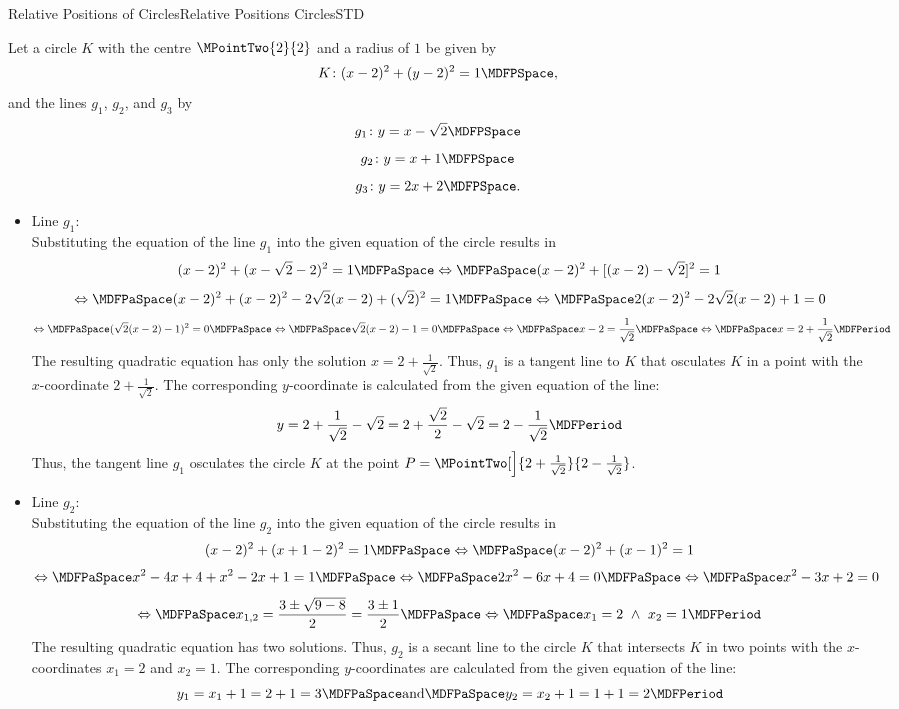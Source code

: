 \begin{MXContent}{Relative Positions of Circles}{Relative Positions Circles}{STD}
\begin{MInfo}
\end{MInfo}

\begin{MExample}
Let a circle $K$ with the centre $\MPointTwo{2}{2}$ and a radius of $1$ be given by
\[
 K\colon (x-2)^2 + (y-2)^2=1 \MDFPSpace ,
\]
and the lines $g_1$, $g_2$, and $g_3$ by
\[
 g_1\colon y=x-\sqrt{2} \MDFPSpace
\]
\[
 g_2\colon y=x+1\MDFPSpace
\]
\[
 g_3\colon y=2x+2 \MDFPSpace .
\]
\begin{itemize}
 \item Line $g_1$:\\
 Substituting the equation of the line $g_1$ into the given equation of the circle results in
 \[
  (x-2)^2 + (x-\sqrt{2}-2)^2=1\MDFPaSpace\Leftrightarrow\MDFPaSpace (x-2)^2 + [(x-2)-\sqrt{2}]^2=1
 \]
 \[
  \Leftrightarrow\MDFPaSpace (x-2)^2 + (x-2)^2 - 2\sqrt{2}(x-2)+(\sqrt{2})^2=1\MDFPaSpace\Leftrightarrow\MDFPaSpace 2(x-2)^2 - 2\sqrt{2}(x-2)+1=0 
 \]
 \[
  \Leftrightarrow\MDFPaSpace (\sqrt{2}(x-2)-1)^2=0\MDFPaSpace\Leftrightarrow\MDFPaSpace \sqrt{2}(x-2)-1=0\MDFPaSpace\Leftrightarrow\MDFPaSpace x-2=\frac{1}{\sqrt{2}}
  \MDFPaSpace\Leftrightarrow\MDFPaSpace x = 2+\frac{1}{\sqrt{2}} \MDFPeriod
 \]
 The resulting quadratic equation has only the solution
  $x = 2+\frac{1}{\sqrt{2}}$. Thus, $g_1$ is a tangent line to $K$ that osculates $K$ in a point with the $x$-coordinate
  $2+\frac{1}{\sqrt{2}}$. The corresponding $y$-coordinate is calculated from the given equation of the line:
 \[
  y=2+\frac{1}{\sqrt{2}}-\sqrt{2}=2+\frac{\sqrt{2}}{2}-\sqrt{2}=2-\frac{1}{\sqrt{2}}\MDFPeriod
 \]
 Thus, the tangent line $g_1$ osculates the circle $K$ at the point $P=\MPointTwo[\Big]{2+\frac{1}{\sqrt{2}}}{2-\frac{1}{\sqrt{2}}}$.
 \item Line $g_2$:\\
 Substituting the equation of the line $g_2$ into the given equation of the circle results in
 \[
  (x-2)^2 + (x+1-2)^2=1\MDFPaSpace\Leftrightarrow\MDFPaSpace (x-2)^2 + (x-1)^2=1
 \]
 \[
  \Leftrightarrow\MDFPaSpace x^2-4x+4+x^2-2x+1=1\MDFPaSpace\Leftrightarrow\MDFPaSpace 2x^2-6x+4=0\MDFPaSpace\Leftrightarrow\MDFPaSpace x^2-3x+2=0
 \]
 \[
  \Leftrightarrow\MDFPaSpace x_{1,2}=\frac{3\pm\sqrt{9-8}}{2}=\frac{3\pm 1}{2}\MDFPaSpace\Leftrightarrow\MDFPaSpace x_1=2\ \wedge\ x_2=1 \MDFPeriod
 \]
  The resulting quadratic equation has two solutions. Thus, $g_2$ is a secant line to the circle $K$ that intersects 
  $K$ in two points with the $x$-coordinates $x_1=2$ and $x_2=1$. The corresponding $y$-coordinates are calculated from 
  the given equation of the line:
 \[
  y_1=x_1+1=2+1=3\MDFPaSpace\textrm{and}\MDFPaSpace y_2=x_2+1=1+1=2\MDFPeriod
\]
\end{itemize}
\end{MExample}
\end{MXContent}
